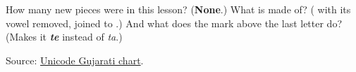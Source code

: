 \begin{tcolorbox}[breakable,colback=teal!4,colframe=teal!35!black,title={Before you move on}]
How many new pieces were in this lesson? (\textbf{None}.) What is \textbf{} made of? (\emph{\textbf{}} with its vowel removed, joined to \emph{\textbf{}}.) And what does the mark above the last letter do? (Makes it \emph{\textbf{te}} instead of \emph{ta}.)

Source: \href{https://www.unicode.org/charts/PDF/U0A80.pdf}{Unicode Gujarati chart}.
\end{tcolorbox}
